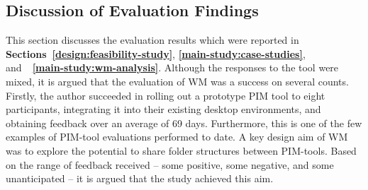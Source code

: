 \subsection{Discussion of Evaluation Findings} 
\label{main-study:discussion:evaluation}

This section discusses the evaluation results which were reported in \textbf{Sections~\ref{design:feasibility-study}}, \textbf{\ref{main-study:case-studies}}, and~\textbf{~\ref{main-study:wm-analysis}}.  
Although the responses to the tool were mixed, it is argued that the evaluation of WM was a success on several counts.  Firstly, the author succeeded in rolling out a prototype PIM tool to eight participants, integrating it into their existing desktop environments, and obtaining feedback over an average of 69 days.  Furthermore, this is one of the few examples of PIM-tool evaluations performed to date.  A key design aim of WM was to explore the potential to share folder structures between PIM-tools.  Based on the range of feedback received -- some positive, some negative, and some unanticipated -- it is argued that the study achieved this aim.



